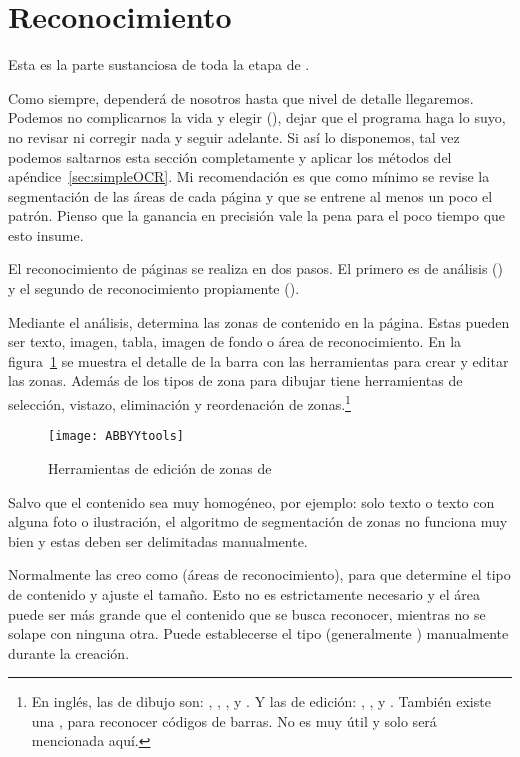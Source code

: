 \documentclass[%
	a5paper,
	10pt,
	twoside,
	openright,
	final,
]{memoir}
\begin{document}
{	\section{Reconocimiento} Esta es la parte sustanciosa de toda la etapa de \ocr.

	Como siempre, dependerá de nosotros hasta que nivel de detalle llegaremos. Podemos no complicarnos la vida y elegir  (), dejar que el programa haga lo suyo, no revisar ni corregir nada y seguir adelante. Si así lo disponemos, tal vez podemos saltarnos esta sección completamente y aplicar los métodos del apéndice~\ref{sec:simpleOCR}. Mi recomendación es que como mínimo se revise la segmentación de las áreas de cada página y que se entrene al menos un poco el patrón. Pienso que la ganancia en precisión vale la pena para el poco tiempo que esto insume.

	El reconocimiento de páginas se realiza en dos pasos. El primero es de análisis () y el segundo de reconocimiento propiamente ().

	Mediante el análisis, \abbyy determina las zonas de contenido en la página. Estas pueden ser texto, imagen, tabla, imagen de fondo o área de reconocimiento. En la figura~\ref{fig:ABBYYtools} se muestra el detalle de la barra con las herramientas para crear y editar las zonas. Además de los tipos de zona para dibujar tiene herramientas de selección, vistazo, eliminación y reordenación de zonas.\footnote{En inglés, las de dibujo son: , , ,  y . Y las de edición: , ,  y . También existe una , para reconocer códigos de barras. No es muy útil y solo será mencionada aquí.}

	\begin{figure}
		\centering
		\texttt{[image: ABBYYtools]}
		\caption{Herramientas de edición de zonas de \abbyy\label{fig:ABBYYtools}}
	\end{figure}

	Salvo que el contenido sea muy homogéneo, por ejemplo: solo texto o texto con alguna foto o ilustración, el algoritmo de segmentación de zonas no funciona muy bien y estas deben ser delimitadas manualmente.

	Normalmente las creo como  (áreas de reconocimiento), para que \abbyy determine el tipo de contenido y ajuste el tamaño. Esto no es estrictamente necesario y el área puede ser más grande que el contenido que se busca reconocer, mientras no se solape con ninguna otra. Puede establecerse el tipo (generalmente ) manualmente durante la creación.

}
\end{document}
